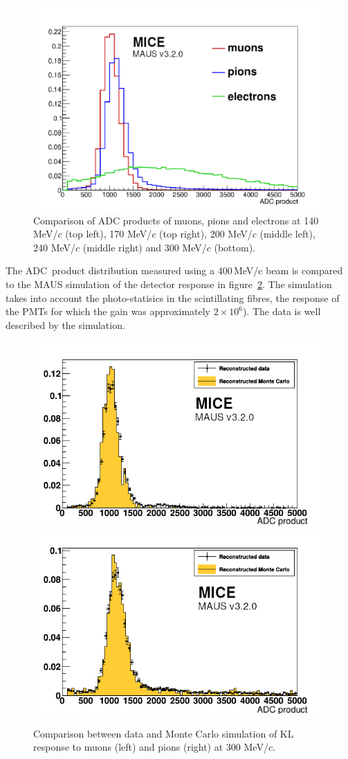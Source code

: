 \begin{figure}
\begin{center}
    \includegraphics[width=0.45\columnwidth]{./04-KL/Figures/mu_vs_pi_vs_e_300MEV.pdf}
  \end{center}
  \caption{
    Comparison of ADC products of muons, pions and electrons at 140
    MeV/$c$ (top left), 170 MeV/$c$ (top right), 200 MeV/$c$ (middle
    left), 240 MeV/$c$ (middle right) and 300 MeV/$c$ (bottom).
  }
  \label{fig:KL4}
\end{figure}

The ADC~product distribution measured using a 400\,MeV/c beam is
compared to the MAUS simulation of the detector response in
figure~\ref{fig:KL_mc_vs_data}.
The simulation takes into account the photo-statisics in the
scintillating fibres, the response of the PMTs for which the gain was
approximately $2 \times 10^6$). 
The data is well described by the simulation.
\begin{figure}
  \begin{center}
    \includegraphics[width=0.4\columnwidth]{./04-KL/Figures/muon_mc_vs_data_edited.png}
    \includegraphics[width=0.4\columnwidth]{./04-KL/Figures/pion_mc_vs_data_edited.png}
  \end{center}
  \caption{
    Comparison between data and Monte Carlo simulation of KL response
    to muons (left) and pions (right) at 300 MeV/$c$.
  } 
  \label{fig:KL_mc_vs_data}
\end{figure}
